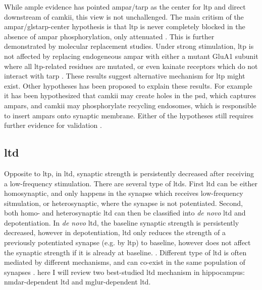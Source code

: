 While ample evidence has pointed \gls{ampar}/\gls{tarp} as the center for \gls{ltp} and direct downstream of \gls{camkii}, this view is not unchallenged. The main critism of the \gls{ampar}/gls{tarp}-center hypothesis is that \gls{ltp} is never completely blocked in the absence of \gls{ampar} phosphorylation, only attenuated \citep{herring16}. This is further demonstrated by molecular replacement studies. Under strong stimulation, \gls{ltp} is not affected by replacing endogeneous \gls{ampar} with either a mutant GluA1 subunit where all \gls{ltp}-related residues are mutated, or even kainate receptors which do not interact with \gls{tarp} \citep{granger13, chen03}. These results suggest alternative mechanism for \gls{ltp} might exist. Other hypotheses has been proposed to explain these results. For example it has been hypothesized that \gls{camkii} may create holes in the \gls{psd}, which captures \glspl{ampar}, and \gls{camkii} may phosphorylate recycling endosomes, which is responsible to insert \glspl{ampar} onto synaptic membrane. Either of the hypotheses still requires further evidence for validation \citep{herring16}.

\subsection{\gls{ltd}}

Opposite to \gls{ltp}, in \gls{ltd}, synaptic strength is persistently decreased after receiving a low-frequency stimulation. There are several type of \glspl{ltd}. First \gls{ltd} can be either homosynaptic, and only happens in the synapse which receives low-frequency sitmulation, or heterosynaptic, where the synapse is not potentiated. Second, both homo- and heterosynaptic \gls{ltd} can then be classified into \textit{de novo} \gls{ltd} and depotentiation. In \textit{de novo} \gls{ltd}, the baseline synaptic strength is persistently decreased, however in depotentiation, \gls{ltd} only reduces the strength of a previously potentiated synapse (e.g. by \gls{ltp}) to baseline, however does not affect the synaptic strength if it is already at baseline. \citep{collingridge10}. Different type of \gls{ltd} is often mediated by different mechanisms, and can co-exist in the same population of synapses \citep{collingridge10}. here I will review two best-studied \gls{ltd} mechanism in hippocampus: \gls{nmdar}-dependent \gls{ltd} and \gls{mglur}-dependent \gls{ltd}.

